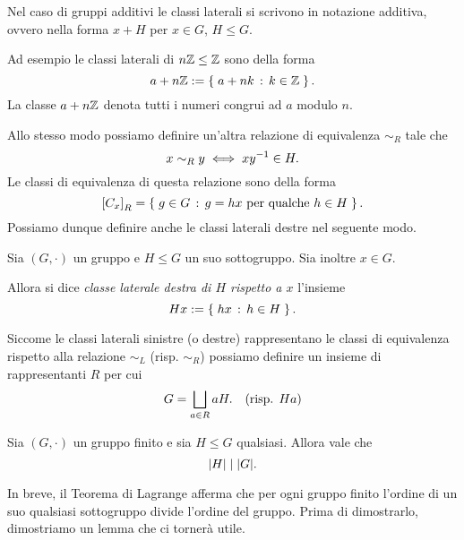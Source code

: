 \begin{remark}
    Nel caso di gruppi additivi le classi laterali si scrivono in notazione additiva, ovvero nella forma $x + H$ per $x \in G$, $H \leq G$.
\end{remark}

\begin{example}
    Ad esempio le classi laterali di $n\mathbb{Z} \leq \mathbb{Z}$ sono della forma \[
        a + n\mathbb{Z} := \left\{\;a + nk \,:\, k \in \mathbb{Z}\;\right\}.
    \] La classe $a + n\mathbb{Z}$ denota tutti i numeri congrui ad $a$ modulo $n$.
\end{example}

Allo stesso modo possiamo definire un'altra relazione di equivalenza $\sim_R$ tale che \[
    x \sim_R y \iff xy^{-1} \in H.    
\] Le classi di equivalenza di questa relazione sono della forma \[
    \eqclass*{x}_R = \set{g \in G \suchthat g = hx \text{ per qualche } h \in H}.    
\] Possiamo dunque definire anche le classi laterali destre nel seguente modo.
\begin{definition}
    Sia $(G, \cdot)$ un gruppo e $H \leq G$ un suo sottogruppo. Sia inoltre $x \in G$.
    
    Allora si dice \emph{classe laterale destra di $H$ rispetto a $x$} l'insieme \[
        Hx := \left\{\;hx \,:\, h \in H\;\right\}. 
    \]
\end{definition}

\begin{remark}
    Siccome le classi laterali sinistre (o destre) rappresentano le classi di equivalenza rispetto alla relazione $\sim_L$ (risp. $\sim_R$) possiamo definire un insieme di rappresentanti $R$ per cui \begin{equation}
        G = \bigsqcup_{a \in R} aH. \quad \text{(risp. $Ha$)}
    \end{equation}
\end{remark}

\begin{theorem}
     \label{th:lagrange}
    Sia $(G, \cdot)$ un gruppo finito e sia $H \leq G$ qualsiasi. Allora vale che \[
        \abs*{H} \divides \abs*{G}.    
    \]
\end{theorem}

In breve, il Teorema di Lagrange afferma che per ogni gruppo finito l'ordine di un suo qualsiasi sottogruppo divide l'ordine del gruppo. Prima di dimostrarlo, dimostriamo un lemma che ci tornerà utile.

